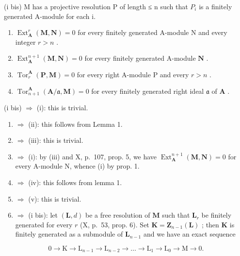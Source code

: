 (i bis) M has a projective resolution P of length ≤ n such that \(P_{i}\) is a finitely generated A-module for each i.

\begin{enumerate}
\def\labelenumi{(\roman{enumi})}
\setcounter{enumi}{1}
\item
  \(\operatorname{Ext}_{\mathbf{A}}^{r}(\mathbf{M},\mathbf{N}) = 0\) for every finitely generated A-module N and every integer \(r > n\) .
\item
  \(\operatorname{Ext}_{\mathbf{A}}^{n+1}(\mathbf{M}, \mathbf{N}) = 0\) for every finitely generated A-module \(\mathbf{N}\) .
\item
  \(\operatorname{Tor}_r^{\mathbf{A}}(\mathbf{P},\mathbf{M}) = 0\) for every right A-module P and every \(r > n\) .
\item
  \(\operatorname{Tor}_{n+1}^{\mathbf{A}}(\mathbf{A}/\mathfrak{a},\mathbf{M}) = 0\) for every finitely generated right ideal \(\mathfrak{a}\) of \(\mathbf{A}\) .
\end{enumerate}

(i bis) \(\Rightarrow\) (i): this is trivial.

\begin{enumerate}
\def\labelenumi{(\roman{enumi})}
\item
  \(\Rightarrow\) (ii): this follows from Lemma 1.
\item
  \(\Rightarrow\) (iii): this is trivial.
\item
  \(\Rightarrow\) (i): by (iii) and X, p.~107, prop. 5, we have \(\operatorname{Ext}_{\mathbf{A}}^{n+1}(\mathbf{M}, \mathbf{N}) = 0\) for every A-module N, whence (i) by prop. 1.
\item
  \(\Rightarrow\) (iv): this follows from lemma 1.
\item
  \(\Rightarrow\) (v): this is trivial.
\item
  \(\Rightarrow\) (i bis): let \((\mathbf{L}, d)\) be a free resolution of \(\mathbf{M}\) such that \(\mathbf{L}_r\) be finitely generated for every \(r\) (X, p.~53, prop. 6). Set \(\mathbf{K} = \mathbf{Z}_{n-1}(\mathbf{L})\) ; then \(\mathbf{K}\) is finitely generated as a submodule of \(\mathbf{L}_{n-1}\) and we have an exact sequence
\end{enumerate}

\[
0 \rightarrow \mathrm{K} \rightarrow \mathrm{L} _ {n - 1} \rightarrow \mathrm{L} _ {n - 2} \rightarrow \dots \rightarrow \mathrm{L} _ {1} \rightarrow \mathrm{L} _ {0} \rightarrow \mathrm{M} \rightarrow 0.\tag{1}
\]

